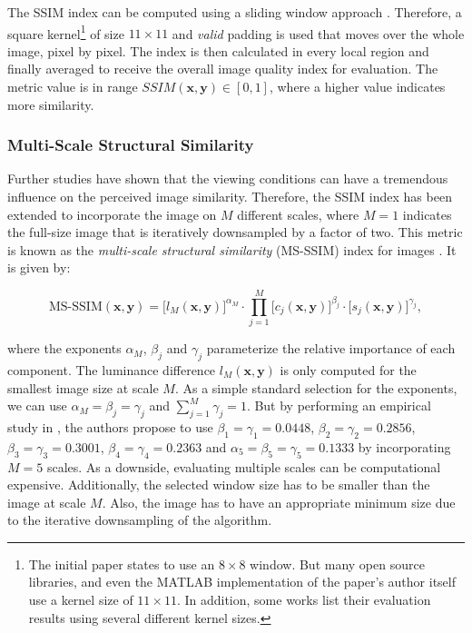The SSIM index can be computed using a sliding window approach \parencite{ssim-slide}. Therefore, a square kernel\footnote{The initial paper states to use an $ 8 \times 8 $ window. But many open source libraries, and even the MATLAB implementation of the paper's author itself use a kernel size of $ 11 \times 11 $. In addition, some works list their evaluation results using several different kernel sizes.} of size $ 11 \times 11 $ and \textit{valid} padding is used that moves over the whole image, pixel by pixel. The index is then calculated in every local region and finally averaged to receive the overall image quality index for evaluation. The metric value is in range $ SSIM(\textbf{x}, \textbf{y}) \in [0, 1] $, where a higher value indicates more similarity.

\subsubsection*{Multi-Scale Structural Similarity}

Further studies have shown that the viewing conditions can have a tremendous influence on the perceived image similarity. Therefore, the SSIM index has been extended to incorporate the image on $ M $ different scales, where $ M=1 $ indicates the full-size image that is iteratively downsampled by a factor of two. This metric is known as the \textit{multi-scale structural similarity} (MS-SSIM) index for images \parencite{ms-ssim}. It is given by:

\begin{equation} \label{eq:ms-ssim}
\textrm{MS-SSIM}(\textbf{x}, \textbf{y}) = \big[ l_M(\textbf{x}, \textbf{y})\big]^{\alpha_M} \cdot \prod\limits_{j=1}^{M} \big[c_j(\textbf{x}, \textbf{y}) \big]^{\beta_j} \cdot \big[ s_j(\textbf{x}, \textbf{y}) \big]^{\gamma_j} ,
\end{equation}

where the exponents $ \alpha_M $, $ \beta_j $ and $ \gamma_j $ parameterize the relative importance of each component. The luminance difference $ l_M(\textbf{x}, \textbf{y}) $ is only computed for the smallest image size at scale $ M $. As a simple standard selection for the exponents, we can use $ \alpha_M = \beta_j = \gamma_j $ and $ \sum_{j=1}^{M} \gamma_j = 1 $. But by performing an empirical study in \parencite{ms-ssim}, the authors propose to use $ \beta_1 = \gamma_1 = 0.0448 $, $ \beta_2 = \gamma_2 = 0.2856 $, $ \beta_3 = \gamma_3 = 0.3001 $, $ \beta_4 = \gamma_4 = 0.2363 $ and $ \alpha_5 = \beta_5 = \gamma_5 = 0.1333 $ by incorporating $ M=5 $ scales. As a downside, evaluating multiple scales can be computational expensive. Additionally, the selected window size has to be smaller than the image at scale $ M $. Also, the image has to have an appropriate minimum size due to the iterative downsampling of the algorithm.


